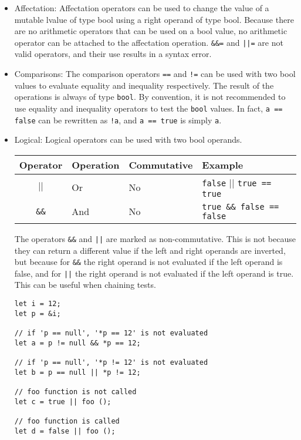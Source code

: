 \begin{itemize}
\item Affectation: Affectation operators can be used to change the value of a
  mutable lvalue of type bool using a right operand of type bool. Because there
  are no arithmetic operators that can be used on a bool value, no arithmetic
  operator can be attached to the affectation operation. \texttt{\&\&=} and
  \texttt{||=} are not valid operators, and their use results in a syntax error.

\item Comparisons: The comparison operators \texttt{==} and \texttt{!=} can be
  used with two bool values to evaluate equality and inequality respectively.
  The result of the operations is always of type \texttt{bool}. By convention,
  it is not recommended to use equality and inequality operators to test the
  \texttt{bool} values. In fact, \texttt{a == false} can be rewritten as
  \texttt{!a}, and \texttt{a == true} is simply \texttt{a}.

\item Logical: Logical operators can be used with two bool operands.

  \begin{center}
    \vspace{-20pt}
    \begin{adjustbox}{max width=1.0\linewidth}
      \begin{tabular}{|c|l l l|}
        \hline
        Operator & Operation & Commutative & Example\\[0pt]
        \hline
        \hline
        \texttt{\(\vert\vert\)} & Or & No & \texttt{false} \(\vert{} \vert{}\) \texttt{true == true}\\[0pt]
        \texttt{\&\&} & And & No & \texttt{true \&\& false == false}\\[0pt]
        \hline
      \end{tabular}
    \end{adjustbox}
  \end{center}

  The operators \texttt{\&\&} and \texttt{||} are marked as non-commutative. This
  is not because they can return a different value if the left and right operands
  are inverted, but because for \texttt{\&\&} the right operand is not evaluated
  if the left operand is false, and for \texttt{||} the right operand is not
  evaluated if the left operand is true. This can be useful when chaining tests.

  \begin{lstlisting}[style=coloredverbatim]
let i = 12;
let p = &i;

// if 'p == null', '*p == 12' is not evaluated
let a = p != null && *p == 12;

// if 'p == null', '*p != 12' is not evaluated
let b = p == null || *p != 12;

// foo function is not called
let c = true || foo ();

// foo function is called
let d = false || foo ();
  \end{lstlisting}
\end{itemize}


